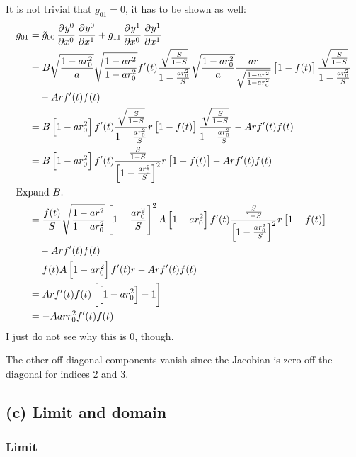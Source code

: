 It is not trivial that $g_{01} = 0$, it has to be shown as well:
\begin{align*}
    g_{01}
    &= \tilde g_{00} \dpd{{y^0}}{{x^0}} \dpd{{y^0}}{{x^1}} + g_{11}
    \dpd{{y^1}}{{x^0}} \dpd{{y^1}}{{x^1}} \\
    &= B \sqrt{\frac{1-ar_0^2}a} \WW f'(t)
    \frac{\sqrt{\frac{S}{1-S}}}{1-\frac{ar_0^2}S} \sqrt{\frac{1-ar_0^2}a}
    \frac{ar}\WW \sbr{1-f(t)} \frac{\sqrt{\frac{S}{1-S}}}{1-\frac{ar_0^2}S} \\
    &\quad - A r f'(t) f(t) \\
    &= B \sbr{1-ar_0^2} f'(t)
    \frac{\sqrt{\frac{S}{1-S}}}{1-\frac{ar_0^2}S} 
    r \sbr{1-f(t)} \frac{\sqrt{\frac{S}{1-S}}}{1-\frac{ar_0^2}S} - A
    r f'(t) f(t) \\
    &= B \sbr{1-ar_0^2} f'(t)
    \frac{\frac{S}{1-S}}{\sbr{1-\frac{ar_0^2}S}^2}
    r \sbr{1-f(t)}  - A
    r f'(t) f(t) \\
    \intertext{%
        Expand $B$.
    }
    &= \frac{f(t)}{S} \WW \sbr{1 - \frac{ar_0^2}S}^2 A \sbr{1-ar_0^2} f'(t)
    \frac{\frac{S}{1-S}}{\sbr{1-\frac{ar_0^2}S}^2} r \sbr{1-f(t)} \\ &\quad - A
    r f'(t) f(t) \\
    &= f(t) A \sbr{1-ar_0^2} f'(t) r - A r f'(t) f(t) \\
    &= A r f'(t) f(t) \sbr{ \sbr{1-ar_0^2} - 1}  \\
    &= - A a r r_0^2 f'(t) f(t)
\end{align*}
I just do not see why this is $0$, though.

The other off-diagonal components vanish since the Jacobian is zero off the
diagonal for indices 2 and 3.

\subsection*{(c) Limit and domain}

\subsubsection*{Limit}

